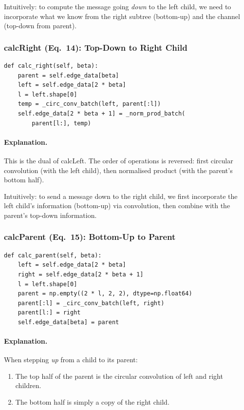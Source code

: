 \documentclass[11pt,a4paper]{article}
\begin{document}
Intuitively: to compute the message going \emph{down} to the left child, we need to incorporate what we know from the right subtree (bottom-up) and the channel (top-down from parent).

\subsubsection{calcRight (Eq.~14): Top-Down to Right Child}

\begin{lstlisting}[caption={calcRight operation}]
def calc_right(self, beta):
    parent = self.edge_data[beta]
    left = self.edge_data[2 * beta]
    l = left.shape[0]
    temp = _circ_conv_batch(left, parent[:l])
    self.edge_data[2 * beta + 1] = _norm_prod_batch(
        parent[l:], temp)
\end{lstlisting}

\paragraph{Explanation.} This is the dual of calcLeft. The order of operations is reversed: first circular convolution (with the left child), then normalised product (with the parent's bottom half).

Intuitively: to send a message down to the right child, we first incorporate the left child's information (bottom-up) via convolution, then combine with the parent's top-down information.

\subsubsection{calcParent (Eq.~15): Bottom-Up to Parent}

\begin{lstlisting}[caption={calcParent operation}]
def calc_parent(self, beta):
    left = self.edge_data[2 * beta]
    right = self.edge_data[2 * beta + 1]
    l = left.shape[0]
    parent = np.empty((2 * l, 2, 2), dtype=np.float64)
    parent[:l] = _circ_conv_batch(left, right)
    parent[l:] = right
    self.edge_data[beta] = parent
\end{lstlisting}

\paragraph{Explanation.} When stepping \emph{up} from a child to its parent:
\begin{enumerate}
    \item The top half of the parent is the circular convolution of left and right children.
    \item The bottom half is simply a copy of the right child.
\end{enumerate}
\end{document}
